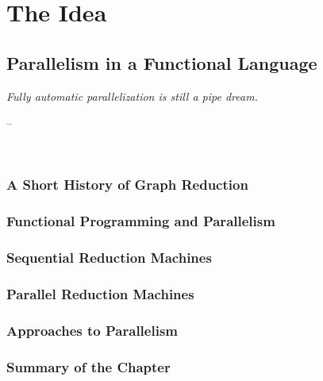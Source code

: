 \documentclass[openright, dottedtoc, headinclude, footinclude=true, a4paper, numbers=noenddot]{scrreprt}
\makeatletter
\newenvironment{chapquote}[2][2em]
  {\setlength{\@tempdima}{#1}%
   \def\chapquote@author{#2}%
   \parshape 1 \@tempdima \dimexpr\textwidth-2\@tempdima\relax%
   \itshape}
  {\par\normalfont\hfill--\ \chapquote@author\hspace*{\@tempdima}\par\noindent\hrulefill\\[1cm]}
\makeatother
\begin{document}
\part{The Idea}
\label{part:idea}
    \chapter{Parallelism in a Functional Language}
    \label{chap:background}
    \begin{chapquote}{\cite{marlowBook}}
        Fully automatic parallelization is still a pipe dream.
    \end{chapquote}
    
    
        \section{A Short History of Graph Reduction}
        \label{sec:shortHistory}
        

        \section{Functional Programming and Parallelism}
        \label{sec:FPandPar}
        
    
        \section{Sequential Reduction Machines}
        \label{sec:SequentialMachines}
        
    
        \section{Parallel Reduction Machines}
        \label{sec:ParallelMachines}
        
    
        \section{Approaches to Parallelism}
        \label{sec:Approaches}
        

        \section{Summary of the Chapter}
        \label{sec:sumBack}
        
        
\end{document}
